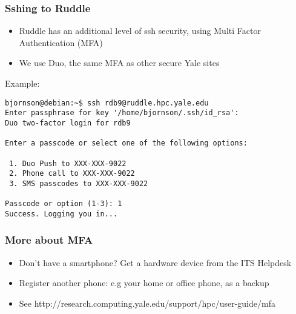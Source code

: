 \documentclass[10pt]{beamer}
\begin{document}
\begin{frame}[fragile]
\frametitle{Sshing to Ruddle}

\begin{itemize}
\item Ruddle has an additional level of ssh security, using Multi Factor Authentication (MFA)
\item We use Duo, the same MFA as other secure Yale sites
\end{itemize}

Example:
\begin{verbatim}
bjornson@debian:~$ ssh rdb9@ruddle.hpc.yale.edu
Enter passphrase for key '/home/bjornson/.ssh/id_rsa': 
Duo two-factor login for rdb9

Enter a passcode or select one of the following options:

 1. Duo Push to XXX-XXX-9022
 2. Phone call to XXX-XXX-9022
 3. SMS passcodes to XXX-XXX-9022

Passcode or option (1-3): 1
Success. Logging you in...
\end{verbatim}  
\end{frame}

\begin{frame}[fragile]
\frametitle{More about MFA}

\begin{itemize}
\item Don't have a smartphone? Get a hardware device from the ITS Helpdesk
\item Register another phone: e.g your home or office phone, as a backup
\item See http://research.computing.yale.edu/support/hpc/user-guide/mfa
\end{itemize}


\end{frame}
\end{document}

